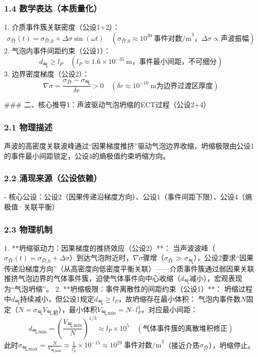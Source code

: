 \documentclass{article}
\begin{document}
\subsubsection{1.4 数学表达（本质量化）}
1. 介质事件簇关联密度（公设1+2）：  
   \[
   \sigma_{\text{介}}(t) = \sigma_{\text{介,0}} + \Delta\sigma \sin(\omega t) \quad (\sigma_{\text{介,0}} \approx 10^{30}\ \text{事件对数/m}^3，\Delta\sigma \propto \text{声波振幅})
   \]
2. 气泡内事件间距约束（公设1）：  
   \[
   d_{\text{气}} \geq l_P \quad (l_P \approx 1.6×10^{-35}\ \text{m}，事件最小间距，不可细分)
   \]
3. 边界密度梯度（公设2）：  
   \[
   \nabla\sigma = \frac{\sigma_{\text{介}} - \sigma_{\text{气}}}{\delta r} > 0 \quad (\delta r \approx 10^{-10}\ \text{m}为边界过渡区厚度)
   \]


### 二、核心推导1：声波驱动气泡坍缩的ECT过程（公设2+4）
\subsubsection{2.1 物理描述}
声波的高密度关联波峰通过“因果梯度推挤”驱动气泡边界收缩，坍缩极限由公设1的事件最小间距锁定，公设4的熵极值约束坍缩方向。

\subsubsection{2.2 涌现来源（公设依赖）}
- 核心公设：公设2（因果传递沿梯度方向）、公设1（事件间距下限）、公设4（熵极值·关联平衡）

\subsubsection{2.3 物理机制}
1. **坍缩驱动力：因果梯度的推挤效应（公设2）**：  
   当声波波峰（$\sigma_{\text{介}}(t) = \sigma_{\text{介,0}} + \Delta\sigma$）到达气泡附近时，$\nabla\sigma$骤增（$\sigma_{\text{介}} \gg \sigma_{\text{气}}$），公设2要求“因果传递沿梯度方向”（从高密度向低密度平衡关联）——介质事件簇通过弱因果关联推挤气泡边界的气体事件簇，迫使气体事件向中心收缩（$d_{\text{气}}$减小），宏观表现为“气泡坍缩”。
2. **坍缩极限：事件离散性的间距约束（公设1）**：  
   坍缩过程中$d_{\text{气}}$持续减小，但公设1规定$d_{\text{气}} \geq l_P$，故坍缩存在最小体积：  
   气泡内事件数$N$固定（$N = \sigma_{\text{气}} V_{\text{气,初}}$），最小体积$V_{\text{气,min}} = N \cdot l_P^3$，对应最小间距：  
   \[
   d_{\text{气,min}} = \left( \frac{V_{\text{气,min}}}{N} \right)^{1/3} \approx l_P \times 10^5 \quad (\text{气体事件簇的离散堆积修正})
   \]
   此时$\sigma_{\text{气,max}} = \frac{N}{V_{\text{气,min}}} \approx \frac{1}{l_P^3} \times 10^{-15} \approx 10^{29}\ \text{事件对数/m}^3$（接近介质$\sigma_{\text{介}}$），坍缩停止。
\end{document}

